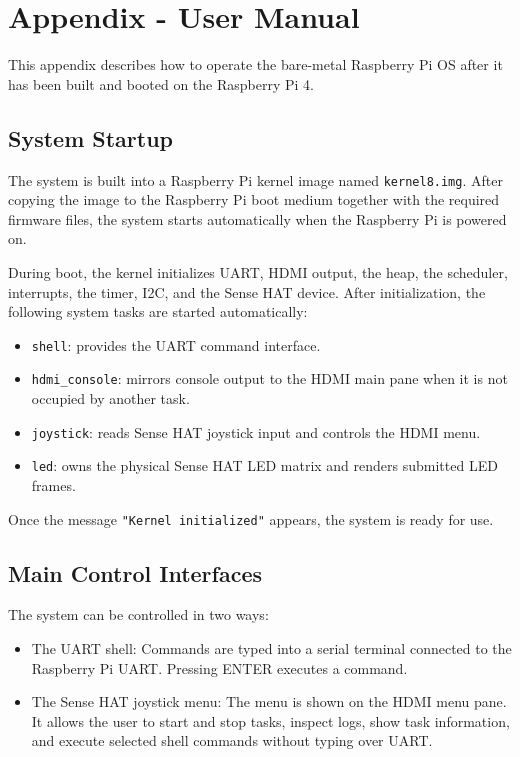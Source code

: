 \appendix

\section{Appendix - User Manual}

This appendix describes how to operate the bare-metal Raspberry Pi OS after it has been built and booted on the Raspberry Pi 4.

\subsection{System Startup}

The system is built into a Raspberry Pi kernel image named \texttt{kernel8.img}. After copying the image to the Raspberry Pi boot medium together with the required firmware files, the system starts automatically when the Raspberry Pi is powered on.

During boot, the kernel initializes UART, HDMI output, the heap, the scheduler, interrupts, the timer, I2C, and the Sense HAT device. After initialization, the following system tasks are started automatically:

\begin{itemize}
    \item \texttt{shell}: provides the UART command interface.
    \item \texttt{hdmi\_console}: mirrors console output to the HDMI main pane when it is not occupied by another task.
    \item \texttt{joystick}: reads Sense HAT joystick input and controls the HDMI menu.
    \item \texttt{led}: owns the physical Sense HAT LED matrix and renders submitted LED frames.
\end{itemize}

Once the message \texttt{"Kernel initialized"} appears, the system is ready for use.

\subsection{Main Control Interfaces}

The system can be controlled in two ways:
\begin{itemize}
\item The UART shell: Commands are typed into a serial terminal connected to the Raspberry Pi UART. Pressing ENTER executes a command.
\item The Sense HAT joystick menu: The menu is shown on the HDMI menu pane. It allows the user to start and stop tasks, inspect logs, show task information, and execute selected shell commands without typing over UART.
\end{itemize}
